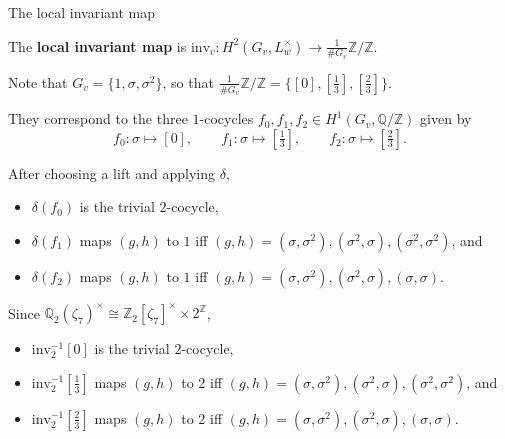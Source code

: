 \documentclass[10pt]{beamer}
\begin{document}
\begin{frame}[t]{The local invariant map}

The \textbf{local invariant map} is $ \mathrm{inv}_v : H^2(G_v, L_w^\times) \to \tfrac{1}{\#G_v}\mathbb{Z} / \mathbb{Z} $.

\pause

\begin{example}[$ K_v = \mathbb{Q}_2 $ and $ L_w = \mathbb{Q}_2(\zeta_7) $]
Note that $ G_v = \{1, \sigma, \sigma^2\} $, so that $ \tfrac{1}{\#G_v}\mathbb{Z} / \mathbb{Z} = \{[0], [\tfrac{1}{3}], [\tfrac{2}{3}]\} $.

\pause

They correspond to the three $ 1 $-cocycles $ f_0, f_1, f_2 \in H^1(G_v, \mathbb{Q} / \mathbb{Z}) $ given by
$$ f_0 : \sigma \mapsto [0], \qquad f_1 : \sigma \mapsto [\tfrac{1}{3}], \qquad f_2 : \sigma \mapsto [\tfrac{2}{3}]. $$

\pause

After choosing a lift and applying $ \delta $,
\begin{itemize}
\item $ \delta(f_0) $ is the trivial $ 2 $-cocycle,
\item $ \delta(f_1) $ maps $ (g, h) $ to $ 1 $ iff $ (g, h) = (\sigma, \sigma^2), (\sigma^2, \sigma), (\sigma^2, \sigma^2) $, and
\item $ \delta(f_2) $ maps $ (g, h) $ to $ 1 $ iff $ (g, h) = (\sigma, \sigma^2), (\sigma^2, \sigma), (\sigma, \sigma) $.
\end{itemize}

\pause

Since $ \mathbb{Q}_2(\zeta_7)^\times \cong \mathbb{Z}_2[\zeta_7]^\times \times 2^\mathbb{Z} $,
\begin{itemize}
\item $ \mathrm{inv}_2^{-1}[0] $ is the trivial $ 2 $-cocycle,
\item $ \mathrm{inv}_2^{-1}[\tfrac{1}{3}] $ maps $ (g, h) $ to $ 2 $ iff $ (g, h) = (\sigma, \sigma^2), (\sigma^2, \sigma), (\sigma^2, \sigma^2) $, and
\item $ \mathrm{inv}_2^{-1}[\tfrac{2}{3}] $ maps $ (g, h) $ to $ 2 $ iff $ (g, h) = (\sigma, \sigma^2), (\sigma^2, \sigma), (\sigma, \sigma) $.
\end{itemize}
\end{example}

\end{frame}
\end{document}
